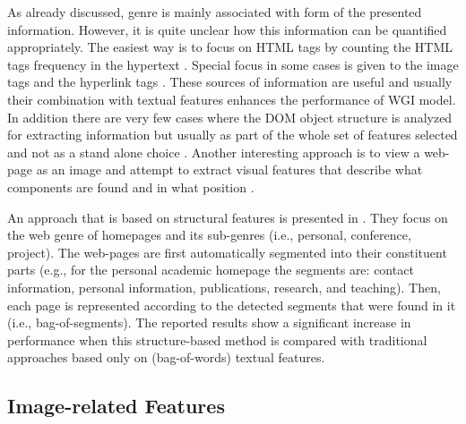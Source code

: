 As already discussed, genre is mainly associated with form of the presented information. However, it is quite unclear how this information can be quantified appropriately. The easiest way is to focus on HTML tags by counting the HTML tags frequency in the hypertext . Special focus in some cases is given to the image tags and the hyperlink tags \parencite{Lim2005,levering2008using}. These sources of information are useful and usually their combination with textual features enhances the performance of
WGI model. In addition there are very few cases where the DOM object structure is analyzed for extracting information but usually as part of the whole set of features selected and not as a stand alone choice \parencite{mehler2011integrating}. Another interesting approach is to view a web-page as an image and attempt to extract visual features that describe what components are found and in what position .



An approach that is based on structural features is presented in . They focus on the web genre of homepages and its sub-genres (i.e., personal, conference, project). The web-pages are first automatically segmented into their constituent parts (e.g., for the personal academic homepage the segments are: contact information, personal information, publications, research, and teaching). Then, each page is represented according to the detected segments that were found in it (i.e., bag-of-segments). The reported results show a significant increase in performance when this structure-based method is compared with traditional approaches based only on (bag-of-words) textual features.

\subsection{Image-related Features} 

